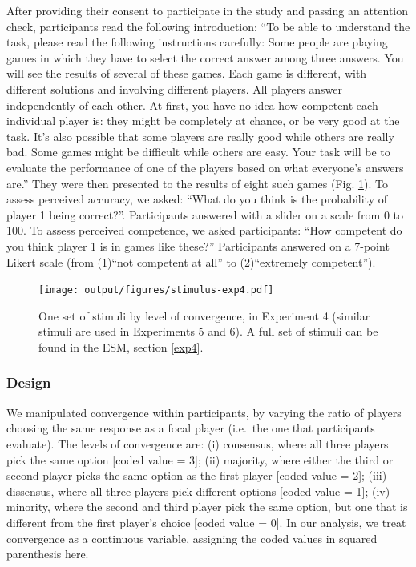 \documentclass[
  doc,floatsintext]{apa6}
\begin{document}
After providing their consent to participate in the study and passing an attention check, participants read the following introduction: ``To be able to understand the task, please read the following instructions carefully: Some people are playing games in which they have to select the correct answer among three answers. You will see the results of several of these games. Each game is different, with different solutions and involving different players. All players answer independently of each other. At first, you have no idea how competent each individual player is: they might be completely at chance, or be very good at the task. It's also possible that some players are really good while others are really bad. Some games might be difficult while others are easy. Your task will be to evaluate the performance of one of the players based on what everyone's answers are.'' They were then presented to the results of eight such games (Fig. \ref{fig:stimulus-exp4}). To assess perceived accuracy, we asked: ``What do you think is the probability of player 1 being correct?''. Participants answered with a slider on a scale from 0 to 100. To assess perceived competence, we asked participants: ``How competent do you think player 1 is in games like these?'' Participants answered on a 7-point Likert scale (from (1)``not competent at all'' to (2)``extremely competent'').



\begin{figure}
\centering
\texttt{[image: output/figures/stimulus-exp4.pdf]}
\caption{\label{fig:stimulus-exp4}One set of stimuli by level of convergence, in Experiment 4 (similar stimuli are used in Experiments 5 and 6). A full set of stimuli can be found in the ESM, section \ref{exp4}.}
\end{figure}

\subsubsection{Design}\label{design-3}

We manipulated convergence within participants, by varying the ratio of players choosing the same response as a focal player (i.e.~the one that participants evaluate). The levels of convergence are: (i) consensus, where all three players pick the same option {[}coded value = 3{]}; (ii) majority, where either the third or second player picks the same option as the first player {[}coded value = 2{]}; (iii) dissensus, where all three players pick different options {[}coded value = 1{]}; (iv) minority, where the second and third player pick the same option, but one that is different from the first player's choice {[}coded value = 0{]}. In our analysis, we treat convergence as a continuous variable, assigning the coded values in squared parenthesis here.
\end{document}
